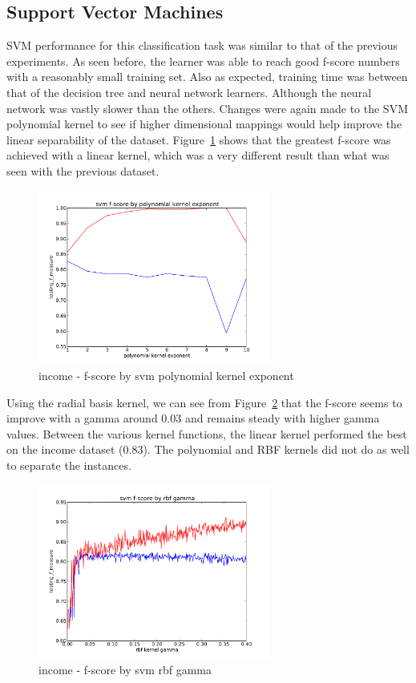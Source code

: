 \documentclass{sig-alternate}
\begin{document}
\subsection{Support Vector Machines}

SVM performance for this classification task was similar to that of the previous experiments. As seen before, the learner was able to reach good f-score numbers with a reasonably small training set. Also as expected, training time was between that of the decision tree and neural network learners. Although the neural network was vastly slower than the others. Changes were again made to the SVM polynomial kernel to see if higher dimensional mappings would help improve the linear separability of the dataset. Figure~\ref{ad-svm-poly} shows that the greatest f-score was achieved with a linear kernel, which was a very different result than what was seen with the previous dataset.

\begin{figure}[!htbp]
    \centering
    \includegraphics[width=3in]{data/adult/svm/polynomial.pdf}
    \caption{income - f-score by svm polynomial kernel exponent \label{ad-svm-poly}}
\end{figure} 

Using the radial basis kernel, we can see from Figure~\ref{ad-svm-rbf} that the f-score seems to improve with a gamma around 0.03 and remains steady with higher gamma values. Between the various kernel functions, the linear kernel performed the best on the income dataset (0.83). The polynomial and RBF kernels did not do as well to separate the instances.

\begin{figure}[!htbp]
    \centering
    \includegraphics[width=3in]{data/adult/svm/rbf.pdf}
    \caption{income - f-score by svm rbf gamma\label{ad-svm-rbf}}
\end{figure} 
\end{document}
